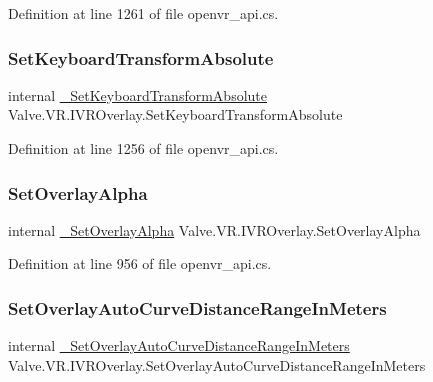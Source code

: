 Definition at line 1261 of file openvr\+\_\+api.\+cs.

\mbox{\label{struct_valve_1_1_v_r_1_1_i_v_r_overlay_a6301a1becb7f7585b70cc413d903b9c1}} 
\subsubsection{\texorpdfstring{SetKeyboardTransformAbsolute}{SetKeyboardTransformAbsolute}}
{\footnotesize\ttfamily internal \mbox{\hyperlink{struct_valve_1_1_v_r_1_1_i_v_r_overlay_a972e7074df2f3719f9df1233d0d4bab9}{\+\_\+\+Set\+Keyboard\+Transform\+Absolute}} Valve.\+V\+R.\+I\+V\+R\+Overlay.\+Set\+Keyboard\+Transform\+Absolute}



Definition at line 1256 of file openvr\+\_\+api.\+cs.

\mbox{\label{struct_valve_1_1_v_r_1_1_i_v_r_overlay_a28263fb51de67daac38fdb2384f8e9bd}} 
\subsubsection{\texorpdfstring{SetOverlayAlpha}{SetOverlayAlpha}}
{\footnotesize\ttfamily internal \mbox{\hyperlink{struct_valve_1_1_v_r_1_1_i_v_r_overlay_a5bdec940e24ef87b9e12c5e9f91862f0}{\+\_\+\+Set\+Overlay\+Alpha}} Valve.\+V\+R.\+I\+V\+R\+Overlay.\+Set\+Overlay\+Alpha}



Definition at line 956 of file openvr\+\_\+api.\+cs.

\mbox{\label{struct_valve_1_1_v_r_1_1_i_v_r_overlay_aca5881d97e0206709e8f37713e1979cc}} 
\subsubsection{\texorpdfstring{SetOverlayAutoCurveDistanceRangeInMeters}{SetOverlayAutoCurveDistanceRangeInMeters}}
{\footnotesize\ttfamily internal \mbox{\hyperlink{struct_valve_1_1_v_r_1_1_i_v_r_overlay_a14c24c561079ac045d2e9fd58b896add}{\+\_\+\+Set\+Overlay\+Auto\+Curve\+Distance\+Range\+In\+Meters}} Valve.\+V\+R.\+I\+V\+R\+Overlay.\+Set\+Overlay\+Auto\+Curve\+Distance\+Range\+In\+Meters}



